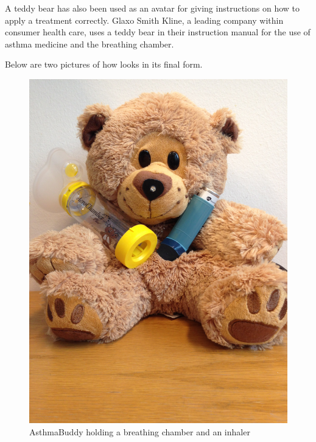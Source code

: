 A teddy bear has also been used as an avatar for giving instructions on how to apply a treatment correctly. Glaxo Smith Kline, a leading company within consumer health care, uses a teddy bear in their instruction manual for the use of asthma medicine and the breathing chamber\cite{glaxosmithkline}. 

Below are two pictures of how \ab{} looks in its final form. 

\begin{figure}[H] 
	\begin{minipage}[t]{0.4\linewidth}
	\centering
		\includegraphics[width=0.3\paperwidth]{Pictures/abandinhaler.jpg}
	\caption[AsthmaBuddy holding a breathing chamber and an inhaler]{AsthmaBuddy holding a breathing chamber and an inhaler}
	\label{fig:asthmabuddyandinhaler}
	\end{minipage}
	\hspace{2.0cm}
	\begin{minipage}[t]{0.4\linewidth}
		\centering

\end{minipage}
\end{figure}
